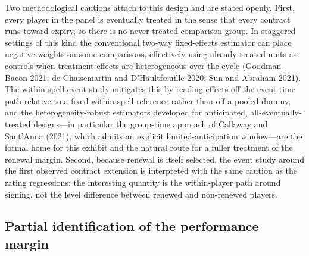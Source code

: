 \documentclass{article}
\begin{document}
Two methodological cautions attach to this design and are stated openly. First,
every player in the panel is eventually treated in the sense that every contract
runs toward expiry, so there is no never-treated comparison group. In staggered
settings of this kind the conventional two-way fixed-effects estimator can place
negative weights on some comparisons, effectively using already-treated units as
controls when treatment effects are heterogeneous over the cycle (Goodman-Bacon
2021; de Chaisemartin and D'Haultf\oe uille 2020; Sun and Abraham 2021). The
within-spell event study mitigates this by reading effects off the event-time path
relative to a fixed within-spell reference rather than off a pooled dummy, and the
heterogeneity-robust estimators developed for anticipated, all-eventually-treated
designs---in particular the group-time approach of Callaway and Sant'Anna (2021),
which admits an explicit limited-anticipation window---are the formal home for this
exhibit and the natural route for a fuller treatment of the renewal margin. Second,
because renewal is itself selected, the event study around the first observed
contract extension is interpreted with the same caution as the rating regressions:
the interesting quantity is the within-player path around signing, not the level
difference between renewed and non-renewed players.

\subsection{Partial identification of the performance margin}
\label{sec:strategy-bounds}
\end{document}
